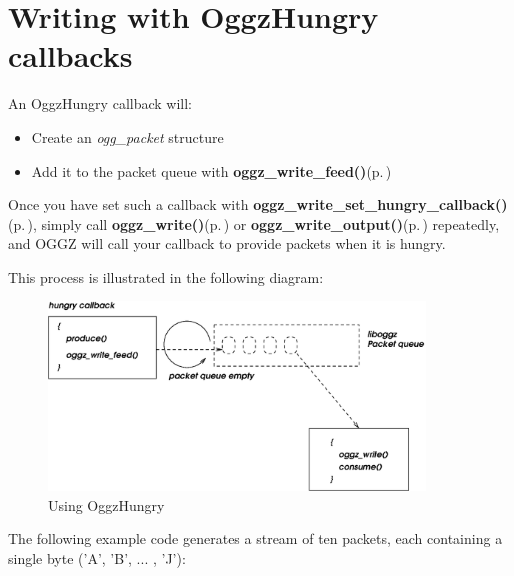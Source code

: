 \section{Writing with Oggz\-Hungry callbacks}
\label{group__hungry}
An Oggz\-Hungry callback will:\begin{itemize}
\item Create an {\em ogg\_\-packet\/} structure\item Add it to the packet queue with {\bf oggz\_\-write\_\-feed()}{\rm (p.\,\pageref{group__write__api_ga2})}\end{itemize}


Once you have set such a callback with {\bf oggz\_\-write\_\-set\_\-hungry\_\-callback()}{\rm (p.\,\pageref{group__write__api_ga1})}, simply call {\bf oggz\_\-write()}{\rm (p.\,\pageref{group__write__api_ga4})} or {\bf oggz\_\-write\_\-output()}{\rm (p.\,\pageref{group__write__api_ga3})} repeatedly, and OGGZ will call your callback to provide packets when it is hungry.

This process is illustrated in the following diagram:

\begin{figure}[H]
\begin{center}
\includegraphics[width=10cm]{hungry}\caption{Using Oggz\-Hungry}
\end{center}
\end{figure}


The following example code generates a stream of ten packets, each containing a single byte ('A', 'B', ... , 'J'):



